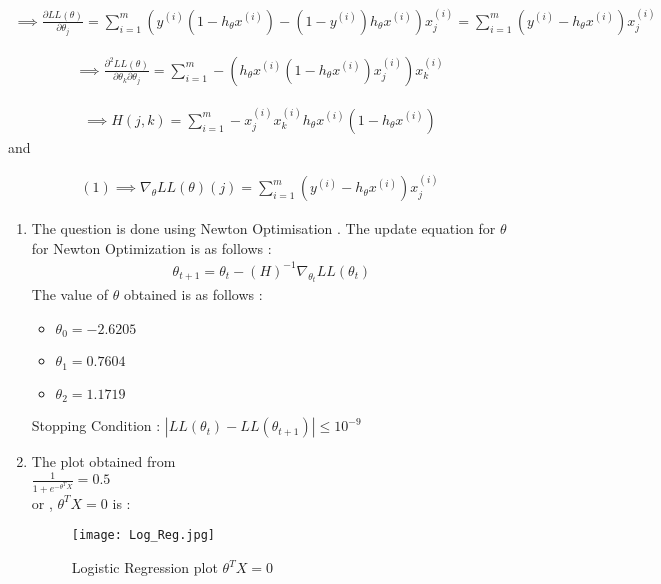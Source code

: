 \documentclass{article}
\begin{document}
        \begin{align}
           \implies \frac{\partial LL(\theta)}{\partial \theta_j} = \sum_{i=1}^{m} (y^{(i)}(1-h_\theta x^{(i)}) - (1-y^{(i)})h_\theta x^{(i)})x^{(i)}_j = \sum_{i=1}^{m} (y^{(i)} - h_\theta x^{(i)})x^{(i)}_j 
        \end{align}  
            
        \begin{align*}
           \implies \frac{\partial ^2 LL(\theta)}{\partial \theta _k \partial \theta_j} = \sum_{i=1}^{m} -(h_\theta x^{(i)}(1 - h_\theta x^{(i)}) x^{(i)}_j)x^{(i)}_k
        \end{align*}  
        
        \begin{align*}
           \implies H(j,k) = \sum_{i=1}^{m} -x^{(i)}_j x^{(i)}_k h_\theta x^{(i)} (1 - h_\theta x^{(i)})
        \end{align*}  
        and
        
        \begin{align*}
           (1) \implies \nabla_\theta LL(\theta)(j) =\sum_{i=1}^{m} (y^{(i)} - h_\theta x^{(i)})x^{(i)}_j 
        \end{align*}  
        
        
        
        
\begin{enumerate}[label=(\alph*)]
    \item The question is done using Newton Optimisation . The update equation for $\theta$ for Newton Optimization is as follows :
    \begin{align*}
           \theta_{t+1} = \theta_t - (H)^{-1}\nabla_{\theta_t} LL(\theta_t)
        \end{align*}
    The value of $\theta$ obtained is as follows :
    \begin{itemize}
        \item $\theta _0 = -2.6205$
        \item $\theta _1 = 0.7604$
        \item $\theta _2 = 1.1719$
    \end{itemize}
    
    Stopping Condition : $|LL(\theta_t) - LL(\theta_{t+1})| \leq 10^{-9}$
    
    \item The plot obtained from \\
        $\frac{1}{1+ e^{-\theta ^TX}} = 0.5$ \\
       or ,  $\theta ^TX =0$ is :
        \begin{figure}[H]
            \centering
            \texttt{[image: Log\_Reg.jpg]}
            \caption{Logistic Regression plot $\theta ^TX = 0$}
            \label{Linear_Reg_Cont_13}
         \end{figure}
\end{enumerate}
\end{document}
